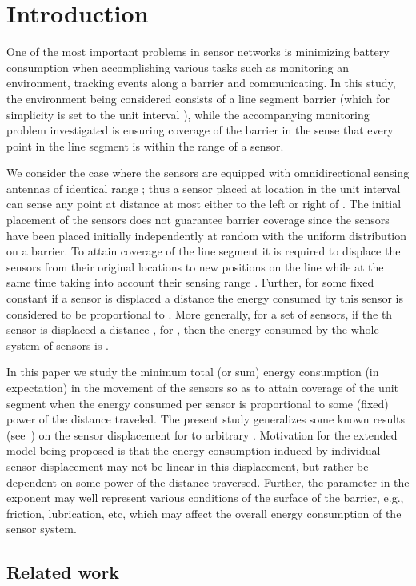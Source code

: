 \documentclass[final,5p,times,twocolumn]{elsarticle_mod}
\begin{document}
\section{Introduction}
One of the most important problems in sensor networks is minimizing battery consumption when accomplishing various tasks such as monitoring an environment, tracking events along a barrier and communicating. In this study, the environment being considered consists of a line segment barrier (which for simplicity is set to the unit interval ), while the accompanying monitoring problem investigated is ensuring coverage of the barrier in the sense that every point in the line segment is within the range of a sensor. 

We consider the case where the sensors are equipped with omnidirectional sensing antennas of identical range ; thus a sensor placed at location  in the unit interval 
can sense any point at distance at most  either to the left or right of . 
The initial placement of the sensors does not guarantee barrier coverage since the sensors have been placed initially independently at random with the uniform distribution on a barrier. 
To attain coverage of the line segment it is required to displace the sensors from their original locations to new positions on the line while at the same time taking 
into account their sensing range . Further, for some fixed constant  if a sensor is displaced a distance  the energy consumed by this sensor is considered 
to be proportional to . 
More generally, for a set of  sensors, if the th sensor is displaced a distance , for , 
then the energy consumed by the whole system of  sensors is .  

In this paper we study the minimum total (or sum) energy consumption (in expectation) in the movement of the sensors so as to attain coverage of the unit segment when 
the energy consumed per sensor is proportional to some (fixed) power of the distance traveled. The present study generalizes some known results (see~\cite{spa_2013}) on the sensor displacement for  to arbitrary . Motivation for the extended model being proposed is that the energy consumption induced by individual sensor displacement may not be linear in this displacement, but rather be dependent on some power of the distance traversed. Further, the parameter  in the exponent may well represent various conditions of the surface of the barrier, e.g., friction, lubrication, etc, which may affect the overall energy consumption of the sensor system. 

\subsection{Related work}
\end{document}
